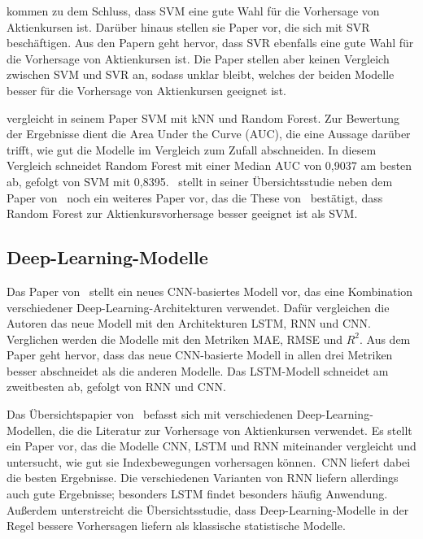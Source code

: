 \textcite{gandhmal2019systematic} kommen zu dem Schluss, dass \ac{SVM} eine gute Wahl für die Vorhersage von Aktienkursen ist. Darüber hinaus stellen sie Paper vor, die sich mit \ac{SVR} beschäftigen. Aus den Papern geht hervor, dass \ac{SVR} ebenfalls eine gute Wahl für die Vorhersage von Aktienkursen ist. Die Paper stellen aber keinen Vergleich zwischen \ac{SVM} und \ac{SVR} an, sodass unklar bleibt, welches der beiden Modelle besser für die Vorhersage von Aktienkursen geeignet ist.

\textcite{ballings2015evaluating} vergleicht in seinem Paper \ac{SVM} mit \ac{kNN} und Random Forest. Zur Bewertung der Ergebnisse dient die Area Under the Curve (AUC), die eine Aussage darüber trifft, wie gut die Modelle im Vergleich zum Zufall abschneiden. In diesem Vergleich schneidet Random Forest mit einer Median AUC von 0,9037 am besten ab, gefolgt von \ac{SVM} mit 0,8395.~\textcite{shah2019stock} stellt in seiner Übersichtsstudie neben dem Paper von~\textcite{ballings2015evaluating} noch ein weiteres Paper vor, das die These von~\textcite{ballings2015evaluating} bestätigt, dass Random Forest zur Aktienkursvorhersage besser geeignet ist als \ac{SVM}.
\subsection{Deep-Learning-Modelle}\label{subsec:deep_learing_modelle}
Das Paper von~\textcite{lu2021cnn} stellt ein neues \ac{CNN}-basiertes Modell vor, das eine Kombination verschiedener Deep-Learning-Architekturen verwendet. Dafür vergleichen die Autoren das neue Modell mit den Architekturen \ac{LSTM}, \ac{RNN} und \ac{CNN}. Verglichen werden die Modelle mit den Metriken \ac{MAE}, \ac{RMSE} und $R^2$. Aus dem Paper geht hervor, dass das neue \ac{CNN}-basierte Modell in allen drei Metriken besser abschneidet als die anderen Modelle. Das \ac{LSTM}-Modell schneidet am zweitbesten ab, gefolgt von \ac{RNN} und \ac{CNN}.

Das Übersichtspapier von~\textcite{rundo2019machine} befasst sich mit verschiedenen Deep-Learning-Modellen, die die Literatur zur Vorhersage von Aktienkursen verwendet. Es stellt ein Paper vor, das die Modelle \ac{CNN}, \ac{LSTM} und \ac{RNN} miteinander vergleicht und untersucht, wie gut sie Indexbewegungen vorhersagen können.~\ac{CNN} liefert dabei die besten Ergebnisse. Die verschiedenen Varianten von \ac{RNN} liefern allerdings auch gute Ergebnisse; besonders \ac{LSTM} findet besonders häufig Anwendung. Außerdem unterstreicht die Übersichtsstudie, dass Deep-Learning-Modelle in der Regel bessere Vorhersagen liefern als klassische statistische Modelle.

